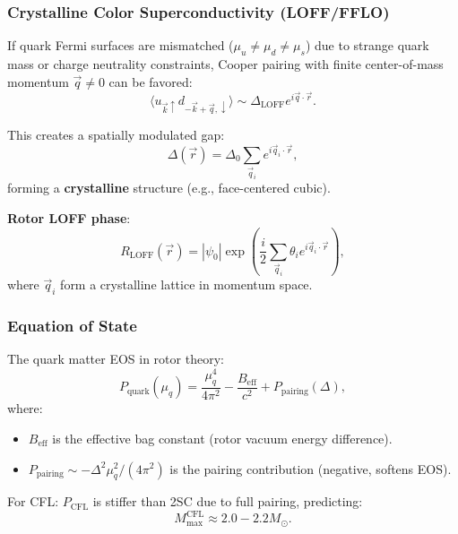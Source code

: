 \documentclass[12pt,a4paper]{article}
\theoremstyle{definition}
\theoremstyle{remark}
\begin{document}
\subsubsection{Crystalline Color Superconductivity (LOFF/FFLO)}

If quark Fermi surfaces are mismatched ($\mu_u \neq \mu_d \neq \mu_s$) due to strange quark mass or charge neutrality constraints, Cooper pairing with finite center-of-mass momentum $\vec{q} \neq 0$ can be favored:
\begin{equation}
\langle u_{\vec{k}\uparrow} d_{-\vec{k}+\vec{q},\downarrow} \rangle \sim \Delta_{\text{LOFF}} e^{i\vec{q} \cdot \vec{r}}.
\end{equation}

This creates a spatially modulated gap:
\begin{equation}
\Delta(\vec{r}) = \Delta_0 \sum_{\vec{q}_i} e^{i\vec{q}_i \cdot \vec{r}},
\end{equation}
forming a \textbf{crystalline} structure (e.g., face-centered cubic).

\textbf{Rotor LOFF phase}:
\begin{equation}
R_{\text{LOFF}}(\vec{r}) = |\psi_0| \exp\left(\frac{i}{2} \sum_{\vec{q}_i} \theta_i e^{i\vec{q}_i \cdot \vec{r}}\right),
\end{equation}
where $\vec{q}_i$ form a crystalline lattice in momentum space.

\subsubsection{Equation of State}

The quark matter EOS in rotor theory:
\begin{equation}
P_{\text{quark}}(\mu_q) = \frac{\mu_q^4}{4\pi^2} - \frac{B_{\text{eff}}}{c^2} + P_{\text{pairing}}(\Delta),
\end{equation}
where:
\begin{itemize}
\item $B_{\text{eff}}$ is the effective bag constant (rotor vacuum energy difference).
\item $P_{\text{pairing}} \sim -\Delta^2 \mu_q^2/(4\pi^2)$ is the pairing contribution (negative, softens EOS).
\end{itemize}

For CFL: $P_{\text{CFL}}$ is stiffer than 2SC due to full pairing, predicting:
\begin{equation}
M_{\text{max}}^{\text{CFL}} \approx 2.0-2.2 M_\odot.
\end{equation}
\end{document}
